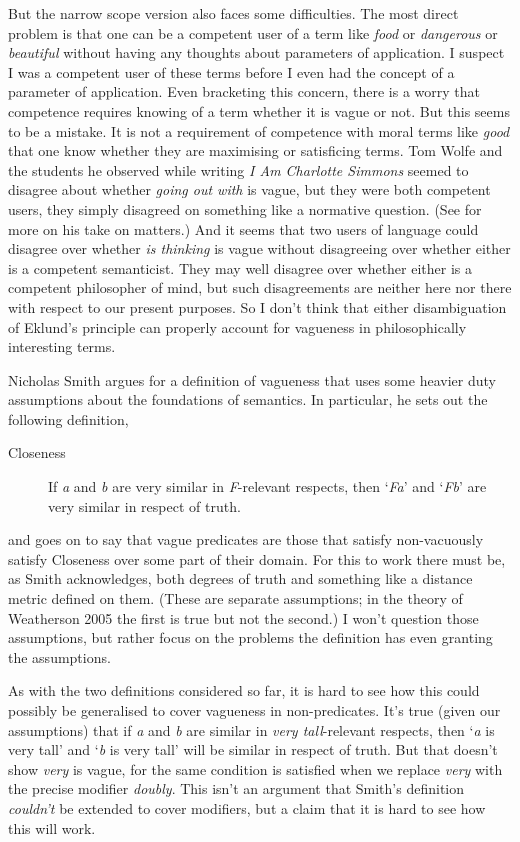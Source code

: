 But the narrow scope version also faces some difficulties. The most direct problem is that one can be a competent user of a term like \textit{food} or \textit{dangerous} or \textit{beautiful} without having any thoughts about parameters of application. I suspect I was a competent user of these terms before I even had the concept of a parameter of application. Even bracketing this concern, there is a worry that competence requires knowing of a term whether it is vague or not. But this seems to be a mistake. It is not a requirement of competence with moral terms like \textit{good} that one know whether they are maximising or satisficing terms. Tom Wolfe and the students he observed while writing \textit{I Am Charlotte Simmons} seemed to disagree about whether \textit{going out with} is vague, but they were both competent users, they simply disagreed on something like a normative question. (See \citet{Wolfe2000} for more on his take on matters.) And it seems that two users of language could disagree over whether \textit{is thinking} is vague without disagreeing over whether either is a competent semanticist. They may well disagree over whether either is a competent philosopher of mind, but such disagreements are neither here nor there with respect to our present purposes. So I don't think that either disambiguation of Eklund's principle can properly account for vagueness in philosophically interesting terms.

Nicholas Smith argues for a definition of vagueness that uses some heavier duty assumptions about the foundations of semantics. In particular, he sets out the following definition,

\begin{description}
\item[Closeness] If \textit{a} and \textit{b} are very similar in \textit{F}{}-relevant respects, then `\textit{Fa}' and `\textit{Fb}' are very similar in respect of truth.
\end{description}

\noindent and goes on to say that vague predicates are those that satisfy non-vacuously satisfy Closeness over some part of their domain. For this to work there must be, as Smith acknowledges, both degrees of truth and something like a distance metric defined on them. (These are separate assumptions; in the theory of Weatherson 2005 the first is true but not the second.) I won't question those assumptions, but rather focus on the problems the definition has even granting the assumptions.

As with the two definitions considered so far, it is hard to see how this could possibly be generalised to cover vagueness in non-predicates. It's true (given our assumptions) that if \textit{a} and \textit{b} are similar in \textit{very tall}{}-relevant respects, then `\textit{a }is very tall' and `\textit{b} is very tall' will be similar in respect of truth. But that doesn't show \textit{very} is vague, for the same condition is satisfied when we replace \textit{very} with the precise modifier \textit{doubly}. This isn't an argument that Smith's definition \textit{couldn't} be extended to cover modifiers, but a claim that it is hard to see how this will work.

